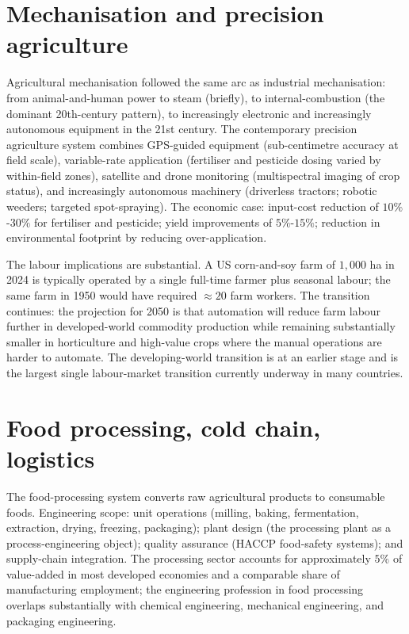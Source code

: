 \section{Mechanisation and precision agriculture}

Agricultural mechanisation followed the same arc as industrial mechanisation: from animal-and-human power to steam (briefly), to internal-combustion (the dominant 20th-century pattern), to increasingly electronic and increasingly autonomous equipment in the 21st century. The contemporary precision agriculture system combines GPS-guided equipment (sub-centimetre accuracy at field scale), variable-rate application (fertiliser and pesticide dosing varied by within-field zones), satellite and drone monitoring (multispectral imaging of crop status), and increasingly autonomous machinery (driverless tractors; robotic weeders; targeted spot-spraying). The economic case: input-cost reduction of $10\%$-$30\%$ for fertiliser and pesticide; yield improvements of $5\%$-$15\%$; reduction in environmental footprint by reducing over-application.

The labour implications are substantial. A US corn-and-soy farm of $1{,}000$ ha in 2024 is typically operated by a single full-time farmer plus seasonal labour; the same farm in 1950 would have required $\approx 20$ farm workers. The transition continues: the projection for 2050 is that automation will reduce farm labour further in developed-world commodity production while remaining substantially smaller in horticulture and high-value crops where the manual operations are harder to automate. The developing-world transition is at an earlier stage and is the largest single labour-market transition currently underway in many countries.

\section{Food processing, cold chain, logistics}

The food-processing system converts raw agricultural products to consumable foods. Engineering scope: unit operations (milling, baking, fermentation, extraction, drying, freezing, packaging); plant design (the processing plant as a process-engineering object); quality assurance (HACCP food-safety systems); and supply-chain integration. The processing sector accounts for approximately $5\%$ of value-added in most developed economies and a comparable share of manufacturing employment; the engineering profession in food processing overlaps substantially with chemical engineering, mechanical engineering, and packaging engineering.

